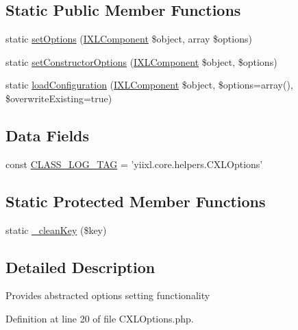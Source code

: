 \subsection*{Static Public Member Functions}
\begin{DoxyCompactItemize}
\item 
static \hyperlink{classCXLOptions_ad3b069fcc716a41662fc6256f080438c}{setOptions} (\hyperlink{interfaceIXLComponent}{IXLComponent} \$object, array \$options)
\item 
static \hyperlink{classCXLOptions_ad1f41e1f366a38ac2842039518c8c042}{setConstructorOptions} (\hyperlink{interfaceIXLComponent}{IXLComponent} \$object, \$options)
\item 
static \hyperlink{classCXLOptions_ac60142407cbd4e84b84ef377481d0d3a}{loadConfiguration} (\hyperlink{interfaceIXLComponent}{IXLComponent} \$object, \$options=array(), \$overwriteExisting=true)
\end{DoxyCompactItemize}
\subsection*{Data Fields}
\begin{DoxyCompactItemize}
\item 
const \hyperlink{classCXLOptions_aa607ab5e557e6ebb60b85c5a20ad067f}{CLASS\_\-LOG\_\-TAG} = 'yiixl.core.helpers.CXLOptions'
\end{DoxyCompactItemize}
\subsection*{Static Protected Member Functions}
\begin{DoxyCompactItemize}
\item 
static \hyperlink{classCXLOptions_ac5e46edc6ee7eaffb86f699aff80e72a}{\_\-cleanKey} (\$key)
\end{DoxyCompactItemize}


\subsection{Detailed Description}
Provides abstracted options setting functionality 

Definition at line 20 of file CXLOptions.php.



